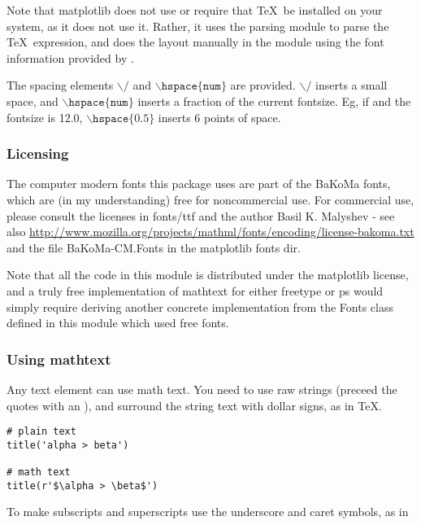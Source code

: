 \documentclass[twoside]{book}
\begin{document}
Note that matplotlib does not use or require that \TeX\ be installed on
your system, as it does not use it.  Rather, it uses the parsing
module  to parse the \TeX\ expression, and does the
layout manually in the  module using the
font information provided by .  

\noindent The spacing elements $\backslash/$ and $\mathtt{\backslash
  hspace\{num\}}$ are provided.  $\backslash /$ inserts a small space,
and $\mathtt{\backslash hspace\{num\}}$ inserts a fraction of the
current fontsize.  Eg, if  and the fontsize is 12.0,
$\mathtt{\backslash hspace\{0.5\}}$ inserts 6 points of space.



\subsubsection{Licensing}
\label{sec:mathtext_license}

The computer modern fonts this package uses are part of the BaKoMa
fonts, which are (in my understanding) free for noncommercial use.
For commercial use, please consult the licenses in fonts/ttf and the
author Basil K. Malyshev - see also
\url{http://www.mozilla.org/projects/mathml/fonts/encoding/license-bakoma.txt}
and the file BaKoMa-CM.Fonts in the matplotlib fonts dir.

Note that all the code in this module is distributed under the
matplotlib license, and a truly free implementation of mathtext for
either freetype or ps would simply require deriving another concrete
implementation from the Fonts class defined in this module which used
free fonts.

\subsubsection{Using mathtext}


Any text element can use math text.  You need to use raw strings
(preceed the quotes with an ), and surround the string text
with dollar signs, as in \TeX.

\begin{lstlisting}
# plain text
title('alpha > beta')

# math text
title(r'$\alpha > \beta$')
\end{lstlisting}

\noindent To make subscripts and superscripts use the underscore and caret
symbols, as in
\end{document}
